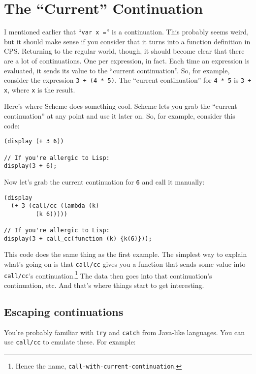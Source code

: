 \documentclass{article}
\begin{document}
\section{The ``Current'' Continuation}\label{sec:the-current-continuation}
  I mentioned earlier that ``{\tt var x =}'' is a continuation. This probably seems weird, but it should make sense if you consider that it turns into a function definition in CPS. Returning
  to the regular world, though, it should become clear that there are a lot of continuations. One per expression, in fact. Each time an expression is evaluated, it sends its value to the
  ``current continuation''. So, for example, consider the expression {\tt 3 + (4 * 5)}. The ``current continuation'' for {\tt 4 * 5} is {\tt 3 + x}, where {\tt x} is the result.

  Here's where Scheme does something cool. Scheme lets you grab the ``current continuation'' at any point and use it later on. So, for example, consider this code:

\begin{verbatim}
(display (+ 3 6))

// If you're allergic to Lisp:
display(3 + 6);
\end{verbatim}

  \noindent Now let's grab the current continuation for {\tt 6} and call it manually:

\begin{verbatim}
(display
  (+ 3 (call/cc (lambda (k)
         (k 6)))))

// If you're allergic to Lisp:
display(3 + call_cc(function (k) {k(6)}));
\end{verbatim}

  \noindent This code does the same thing as the first example. The simplest way to explain what's going on is that {\tt call/cc} gives you a function that sends some value into {\tt
  call/cc}'s continuation.\footnote{Hence the name, {\tt call-with-current-continuation}.} The data then goes into that continuation's continuation, etc. And that's where things start to get
  interesting.

\subsection{Escaping continuations}\label{sec:the-current-continuation-escaping-continuations}
    You're probably familiar with {\tt try} and {\tt catch} from Java-like languages. You can use {\tt call/cc} to emulate these. For example:
\end{document}
